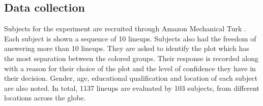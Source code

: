 
\subsection{Data collection}

Subjects  for the experiment are recruited through Amazon Mechanical Turk  \citep{turk}. Each subject is shown a sequence of 10 lineups. Subjects also had the freedom of answering more than 10 lineups. They are asked to identify the plot which has the most separation between the colored groups. Their response is recorded along with a reason for their choice of the plot and the level of confidence they have in their decision.  Gender, age, educational qualification and location of each subject are also noted. In total, 1137 lineups are evaluated by 103 subjects, from different locations across the globe.








